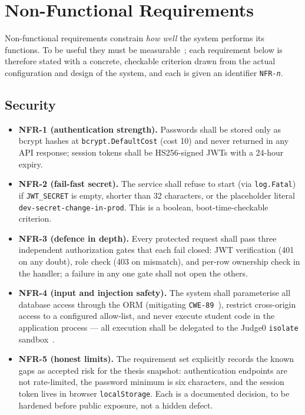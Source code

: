 \section{Non-Functional Requirements}
\label{sec:req-nfr}

Non-functional requirements constrain \emph{how well} the system performs its functions.
To be useful they must be measurable~\cite{sommerville-se}; each requirement below is
therefore stated with a concrete, checkable criterion drawn from the actual
configuration and design of the system, and each is given an identifier
\texttt{NFR-\emph{n}}.

\subsection{Security}
\label{sec:req-nfr-security}

\begin{itemize}[leftmargin=1.4em]
  \item \textbf{NFR-1 (authentication strength).} Passwords shall be stored only as
        bcrypt hashes at \texttt{bcrypt.DefaultCost} (cost 10) and never returned in any
        API response; session tokens shall be HS256-signed JWTs with a 24-hour expiry.
  \item \textbf{NFR-2 (fail-fast secret).} The service shall refuse to start (via
        \texttt{log.Fatal}) if \texttt{JWT\_SECRET} is empty, shorter than 32 characters,
        or the placeholder literal \texttt{dev-secret-change-in-prod}. This is a boolean,
        boot-time-checkable criterion.
  \item \textbf{NFR-3 (defence in depth).} Every protected request shall pass three
        independent authorization gates that each fail closed: JWT verification (401 on
        any doubt), role check (403 on mismatch), and per-row ownership check in the
        handler; a failure in any one gate shall not open the others.
  \item \textbf{NFR-4 (input and injection safety).} The system shall parameterise all
        database access through the ORM (mitigating \texttt{CWE-89}~\cite{cwe-89}),
        restrict cross-origin access to a configured allow-list, and never execute
        student code in the application process --- all execution shall be delegated to
        the Judge0 \texttt{isolate} sandbox~\cite{judge0,isolate}.
  \item \textbf{NFR-5 (honest limits).} The requirement set explicitly records the known
        gaps as accepted risk for the thesis snapshot: authentication endpoints are not
        rate-limited, the password minimum is six characters, and the session token lives
        in browser \texttt{localStorage}. Each is a documented decision, to be hardened
        before public exposure, not a hidden defect.
\end{itemize}

